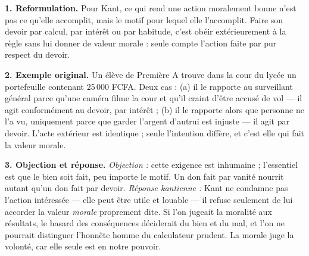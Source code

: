 \documentclass[11pt]{article}
\begin{document}
\begin{corrige}

\textbf{1. Reformulation.} Pour Kant, ce qui rend une action moralement bonne n'est pas ce qu'elle accomplit, mais le motif pour lequel elle l'accomplit. Faire son devoir par calcul, par intérêt ou par habitude, c'est obéir extérieurement à la règle sans lui donner de valeur morale : seule compte l'action faite par pur respect du devoir.

\textbf{2. Exemple original.} Un élève de Première A trouve dans la cour du lycée un portefeuille contenant 25\,000 FCFA. Deux cas : (a) il le rapporte au surveillant général parce qu'une caméra filme la cour et qu'il craint d'être accusé de vol — il agit conformément au devoir, par intérêt ; (b) il le rapporte alors que personne ne l'a vu, uniquement parce que garder l'argent d'autrui est injuste — il agit par devoir. L'acte extérieur est identique ; seule l'intention diffère, et c'est elle qui fait la valeur morale.

\textbf{3. Objection et réponse.} \emph{Objection :} cette exigence est inhumaine ; l'essentiel est que le bien soit fait, peu importe le motif. Un don fait par vanité nourrit autant qu'un don fait par devoir. \emph{Réponse kantienne :} Kant ne condamne pas l'action intéressée — elle peut être utile et louable — il refuse seulement de lui accorder la valeur \emph{morale} proprement dite. Si l'on jugeait la moralité aux résultats, le hasard des conséquences déciderait du bien et du mal, et l'on ne pourrait distinguer l'honnête homme du calculateur prudent. La morale juge la volonté, car elle seule est en notre pouvoir.
\end{corrige}
\end{document}
